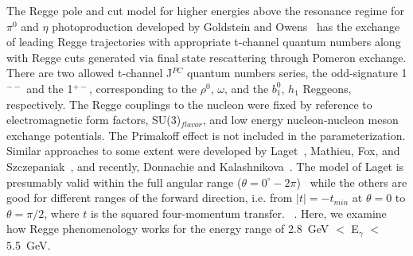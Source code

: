 \documentclass[aps,prc,twocolumn,floatfix,showpacs,preprintnumbers,amsmath,amssymb,superscriptaddress]{revtex4-1}
\begin{document}
The Regge pole and cut model for higher energies above the
resonance regime for $\pi^0$ and $\eta$ photoproduction developed by Goldstein 
and Owens~\cite{Goldstein} has the exchange of leading Regge 
trajectories with appropriate t-channel quantum numbers along 
with Regge cuts generated via 
final state rescattering 
through Pomeron exchange. There are two allowed t-channel J$^{PC}$ 
quantum numbers series, the odd-signature 1$^{--}$ and the 1$^{+-}$, 
corresponding to the $\rho^0$, $\omega$, and the $b^0_1$, $h_1$ 
Reggeons, respectively. The Regge couplings to the nucleon were fixed by 
reference to electromagnetic form factors, SU(3)$_{flavor}$, and low 
energy nucleon-nucleon meson exchange potentials.  The Primakoff 
effect is not included in the parameterization.  Similar approaches 
to some extent were developed by Laget~\cite{Laget}, Mathieu, 
Fox, and Szczepaniak~\cite{Mathieu}, and recently, Donnachie and 
Kalashnikova~\cite{Donnachie}.  
The model of Laget is presumably 
valid within the full angular range ($\theta = 
0^\circ - 2\pi$)~\cite{Laget} while the others are 
good for different ranges of the forward direction, i.e. from $|t| = 
-t_{min}$ at $\theta=0$ to $\theta=\pi/2$, where $t$ is the squared four-momentum 
transfer.
~\cite{Goldstein,Mathieu,Donnachie}. Here, we examine
how Regge phenomenology works for the energy range of 
2.8~GeV $< $ E$_\gamma$ $<$ 5.5~GeV.
\end{document}
